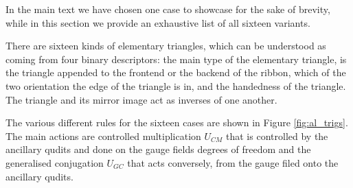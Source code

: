 \documentclass[two column]{article}
\begin{document}
In the main text we have chosen one case to showcase for the sake of brevity, while in this section we provide an exhaustive list of all sixteen variants.

There are sixteen kinds of elementary triangles, which can be understood as coming from four binary descriptors: the main type of the elementary triangle, is the triangle appended to the frontend or the backend of the ribbon, which of the two orientation the edge of the triangle is in, and the handedness of the triangle. The triangle and its mirror image act as inverses of one another.

The various different rules for the sixteen cases are shown in Figure \ref{fig:al_trigs}. The main actions are controlled multiplication $U_{CM}$ that is controlled by the ancillary qudits and done on the gauge fields degrees of freedom and the generalised conjugation $U_{GC}$ that acts conversely, from the gauge filed onto the ancillary qudits.
\end{document}
